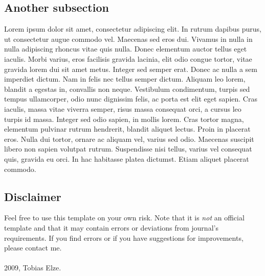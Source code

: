 \documentclass[aps,prb,preprint,groupedaddress,showkeys]{revtex4}
\begin{document}
\subsection{Another subsection}

Lorem ipsum dolor sit amet, consectetur adipiscing elit. In rutrum dapibus purus, ut consectetur augue commodo vel. Maecenas sed eros dui. Vivamus in nulla in nulla adipiscing rhoncus vitae quis nulla. Donec elementum auctor tellus eget iaculis. Morbi varius, eros facilisis gravida lacinia, elit odio congue tortor, vitae gravida lorem dui sit amet metus. Integer sed semper erat. Donec ac nulla a sem imperdiet dictum. Nam in felis nec tellus semper dictum. Aliquam leo lorem, blandit a egestas in, convallis non neque. Vestibulum condimentum, turpis sed tempus ullamcorper, odio nunc dignissim felis, ac porta est elit eget sapien. Cras iaculis, massa vitae viverra semper, risus massa consequat orci, a cursus leo turpis id massa. Integer sed odio sapien, in mollis lorem. Cras tortor magna, elementum pulvinar rutrum hendrerit, blandit aliquet lectus. Proin in placerat eros. Nulla dui tortor, ornare ac aliquam vel, varius sed odio. Maecenas suscipit libero non sapien volutpat rutrum. Suspendisse nisi tellus, varius vel consequat quis, gravida eu orci. In hac habitasse platea dictumst. Etiam aliquet placerat commodo.


\subsection{Disclaimer}

Feel free to use this template on your own risk. Note that it is \textit{not} an 
official template and that it may contain errors or deviations from 
journal's requirements. If you find errors or if you have 
suggestions for improvements, please contact me.\\ \\
\textcopyright{} 2009, Tobias Elze.
\end{document}
